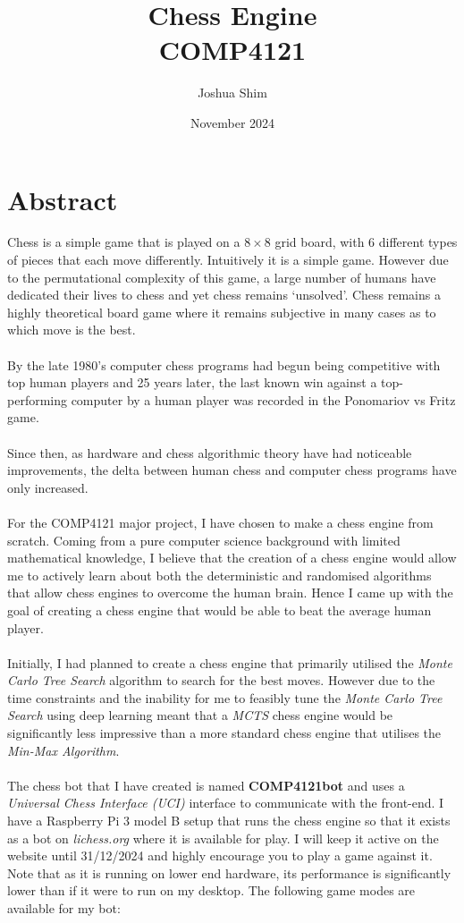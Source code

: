 \documentclass[a4paper,12pt]{report}
\title{Chess Engine\\
{\Large COMP4121}}
\author{Joshua Shim}
\date{November 2024}
\begin{document}
\maketitle
\chapter*{Abstract}

Chess is a simple game that is played on a $8 \times 8$ grid board, with 6 different types of pieces that each move differently. Intuitively it is a simple game. However due to the permutational complexity of this game, a large number of humans have dedicated their lives to chess and yet chess remains `unsolved'. Chess remains a highly theoretical board game where it remains subjective in many cases as to which move is the best.
\\\\
By the late 1980's computer chess programs had begun being competitive with top human players and 25 years later, the last known win against a top-performing computer by a human player was recorded in the Ponomariov vs Fritz game.
\\\\
Since then, as hardware and chess algorithmic theory have had noticeable improvements, the delta between human chess and computer chess programs have only increased.
\\\\
For the COMP4121 major project, I have chosen to make a chess engine from scratch. Coming from a pure computer science background with limited mathematical knowledge, I believe that the creation of a chess engine would allow me to actively learn about both the deterministic and randomised algorithms that allow chess engines to overcome the human brain. Hence I came up with the goal of creating a chess engine that would be able to beat the average human player.
\\\\
Initially, I had planned to create a chess engine that primarily utilised the \textit{Monte Carlo Tree Search} algorithm to search for the best moves. However due to the time constraints and the inability for me to feasibly tune the \textit{Monte Carlo Tree Search} using deep learning meant that a \textit{MCTS} chess engine would be significantly less impressive than a more standard chess engine that utilises the \textit{Min-Max Algorithm}.
\\\\
The chess bot that I have created is named \textbf{COMP4121bot} and uses a \textit{Universal Chess Interface (UCI)} interface to communicate with the front-end. I have a Raspberry Pi 3 model B setup that runs the chess engine so that it exists as a bot on \textit{lichess.org} where it is available for play. I will keep it active on the website until 31/12/2024 and highly encourage you to play a game against it. Note that as it is running on lower end hardware, its performance is significantly lower than if it were to run on my desktop. The following game modes are available for my bot:
\end{document}
